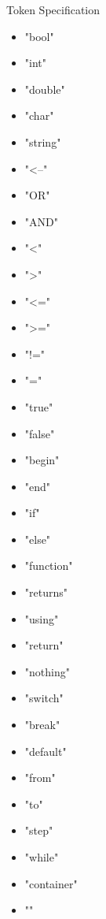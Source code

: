 
Token Specification 

\begin{itemize}

\item "bool"
\item "int"
\item "double"
\item "char"
\item "string"
\item "<--"
\item "OR"
\item "AND"
\item "<"
\item ">"
\item "<="
\item ">="
\item "!="
\item "="
\item "true"
\item "false"
\item "begin"
\item "end"
\item "if"
\item "else"
\item "function"
\item "returns"
\item "using"
\item "return"
\item "nothing"
\item "switch"
\item "break"
\item "default"
\item "from"
\item "to"
\item "step"
\item "while"



\item "container"


\item ""
\end{itemize}